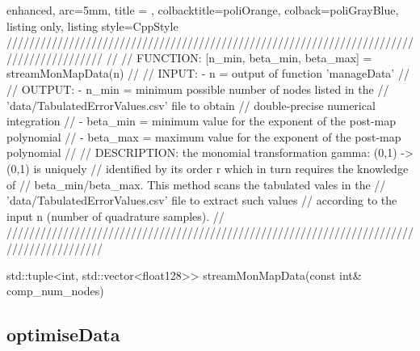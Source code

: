 \documentclass[a4paper, twosided]{book}
\begin{document}
\begin{tcblisting}{enhanced,
                   arc=5mm,
                   title = \color{black}{\large \ttfamily DatIo.cpp/streamMonMapData},
                   colbacktitle=poliOrange,
                   colback=poliGrayBlue,
                   listing only,
                   listing style=CppStyle}
/////////////////////////////////////////////////////////////////////////////////////////
//
//       FUNCTION: [n_min, {beta_min, beta_max}] = streamMonMapData(n)
//                
//          INPUT: - n = output of function 'manageData'
//
//         OUTPUT: - n_min = minimum possible number of nodes listed in the 
//                           'data/TabulatedErrorValues.csv' file to obtain 
//                           double-precise numerical integration
//                 - beta_min = minimum value for the exponent of the post-map polynomial
//                 - beta_max = maximum value for the exponent of the post-map polynomial
//
//    DESCRIPTION: the monomial transformation gamma: (0,1) -> (0,1) is uniquely 
//                 identified by its order r which in turn requires the knowledge of
//                 beta_min/beta_max. This method scans the tabulated vales in the 
//                 'data/TabulatedErrorValues.csv' file to extract such values
//                 according to the input n (number of quadrature samples).
//
/////////////////////////////////////////////////////////////////////////////////////////

std::tuple<int, std::vector<float128>> streamMonMapData(const int& comp_num_nodes)
\end{tcblisting}

\newpage
\subsection[optimiseData]{\changefont optimiseData}\label{SubSec4.2.3}
\end{document}
